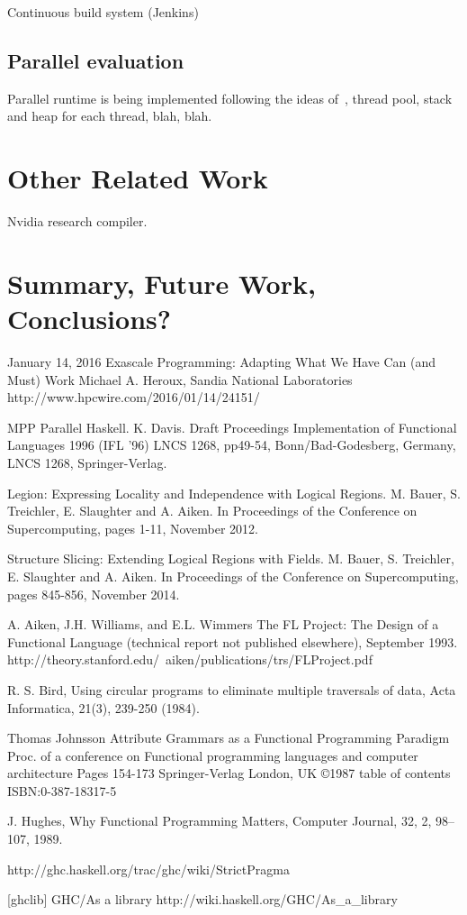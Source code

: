 \documentclass{llncs}
\begin{document}
Continuous build system (Jenkins)


\subsection{Parallel evaluation}

Parallel runtime is being implemented following the ideas of~\cite{SPJs-many-papers}, thread pool,
stack and heap for each thread, blah, blah.

\section{Other Related Work}
Nvidia research compiler.

\section{Summary, Future Work, Conclusions?}


%
%
\begin{thebibliography}{5}

January 14, 2016
Exascale Programming: Adapting What We Have Can (and Must) Work
Michael A. Heroux, Sandia National Laboratories
http://www.hpcwire.com/2016/01/14/24151/


MPP Parallel Haskell. 
K. Davis. 
Draft Proceedings Implementation of Functional Languages 1996 (IFL '96) LNCS
1268, pp49-54, Bonn/Bad-Godesberg, Germany, LNCS 1268, Springer-Verlag.

Legion: Expressing Locality and Independence with Logical
  Regions. M. Bauer, S. Treichler, E. Slaughter and A. Aiken. In Proceedings
  of the Conference on Supercomputing, pages 1-11, November 2012.

Structure Slicing: Extending Logical Regions with Fields. M. Bauer, S. Treichler, E. Slaughter and A. Aiken. In Proceedings of the Conference on Supercomputing, pages 845-856, November 2014.

A. Aiken, J.H. Williams, and E.L. Wimmers
The FL Project:  The Design of a Functional Language
(technical report not published elsewhere), September 1993.
http://theory.stanford.edu/~aiken/publications/trs/FLProject.pdf

R. S. Bird, 
Using circular programs to eliminate multiple traversals of data, 
Acta Informatica, 21(3), 239-250 (1984).

Thomas Johnsson
Attribute Grammars as a Functional Programming Paradigm
Proc. of a conference on Functional programming languages and computer architecture
Pages 154-173 
Springer-Verlag London, UK ©1987 
table of contents ISBN:0-387-18317-5

J. Hughes,
Why Functional Programming Matters,
Computer Journal,
32,
2,
98--107,
1989.

http://ghc.haskell.org/trac/ghc/wiki/StrictPragma

[ghclib] GHC/As a library http://wiki.haskell.org/GHC/As\_a\_library

\end{thebibliography}
\end{document}
